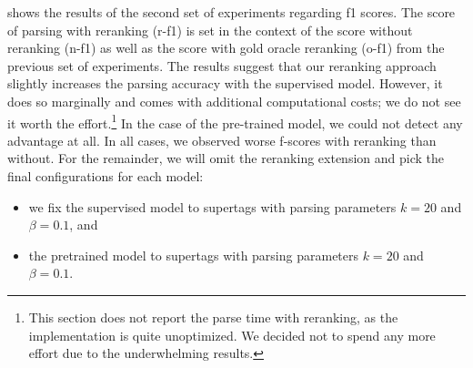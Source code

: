 \documentclass[../../document.tex]{subfiles}
\begin{document}
     shows the results of the second set of experiments regarding f1 scores.
    The score of parsing with reranking (r-f1) is set in the context of the score without reranking (n-f1) as well as the score with gold oracle reranking (o-f1) from the previous set of experiments.
    The results suggest that our reranking approach slightly increases the parsing accuracy with the supervised model.
    However, it does so marginally and comes with additional computational costs; we do not see it worth the effort.\footnote{
        This section does not report the parse time with reranking, as the implementation is quite unoptimized.
        We decided not to spend any more effort due to the underwhelming results.
    }
    In the case of the pre-trained model, we could not detect any advantage at all. In all cases, we observed worse f-scores with reranking than without.
    For the remainder, we will omit the reranking extension and pick the final configurations for each model:
    \begin{itemize}
        \item we fix the supervised model to  supertags with parsing parameters \(k=20\) and \(\beta=0.1\), and
        \item the pretrained model to  supertags with parsing parameters \(k=20\) and \(\beta=0.1\).
    \end{itemize}
\end{document}
